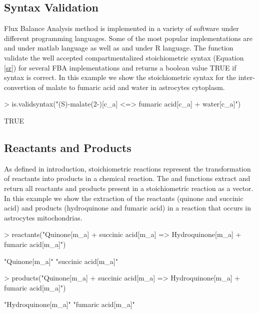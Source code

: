 \subsection{Syntax Validation}
Flux Balance Analysis method is implemented in a variety of software under different programming languages. Some of the most popular implementations are  \citep{Becker2007} and  \citep{Agren2013} under matlab language as well as  and  under R language. The  function validate the well accepted compartmentalized stoichiometric syntax (Equation \ref{sr}) for several FBA implementations and returns a boolean value TRUE if syntax is correct. In this example we show the stoichiometric syntax for the inter-convertion of  malate to fumaric acid and water in astrocytes cytoplasm.
\begin{Schunk}
\begin{Sinput}
> is.validsyntax("(S)-malate(2-)[c_a] <=> fumaric acid[c_a] + water[c_a]")
\end{Sinput}
\begin{Soutput}
[1] TRUE
\end{Soutput}
\end{Schunk}
\subsection{Reactants and Products}
As defined in introduction, stoichiometric reactions represent the transformation of reactants into products in a chemical reaction. The  and  functions extract and return all reactants and products present in a stoichiometric reaction  as a vector. In this example we show the extraction of the reactants (quinone and succinic acid) and products (hydroquinone and fumaric acid) in a reaction that occurs in astrocytes mitochondrias.
\begin{Schunk}
\begin{Sinput}
> reactants("Quinone[m_a] + succinic acid[m_a] => Hydroquinone[m_a] + fumaric acid[m_a]")
\end{Sinput}
\begin{Soutput}
[1] "Quinone[m_a]"       "succinic acid[m_a]"
\end{Soutput}
\begin{Sinput}
> products("Quinone[m_a] + succinic acid[m_a] => Hydroquinone[m_a] + fumaric acid[m_a]")
\end{Sinput}
\begin{Soutput}
[1] "Hydroquinone[m_a]" "fumaric acid[m_a]"
\end{Soutput}
\end{Schunk}
